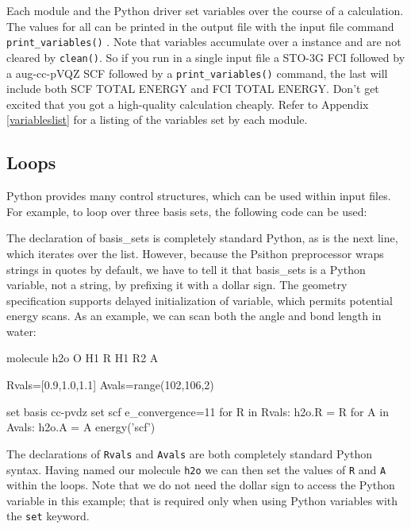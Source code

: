 Each module and the Python driver set \PSI variables over the course of
a calculation.  The values for all can be printed in the output file
with the input file command \texttt{print\_variables()} . Note that
\PSI variables accumulate over a \PSIfour instance and are not cleared by
\texttt{clean()}. So if you run in a single input file a STO-3G FCI
followed by a aug-cc-pVQZ SCF followed by a \texttt{print\_variables()}
command, the last will include both SCF TOTAL ENERGY and FCI TOTAL
ENERGY. Don't get excited that you got a high-quality calculation
cheaply. Refer to Appendix \ref{variableslist} for a listing of the
variables set by each module.

\subsection{Loops}
Python provides many control structures, which can be used within \PSIfour
input files. For example, to loop over three basis sets, the following code can
be used:
The declaration of basis\_sets is completely standard Python, as is the next
line, which iterates over the list. However, because the Psithon preprocessor
wraps strings in quotes by default, we have to tell it that basis\_sets is a
Python variable, not a string, by prefixing it with a dollar sign. The geometry
specification supports delayed initialization of variable, which permits
potential energy scans. As an example, we can scan both the angle and bond
length in water:
\begin{Snippet}
molecule h2o{
  O
  H1 R
  H1 R2 A
}

Rvals=[0.9,1.0,1.1]
Avals=range(102,106,2)

set basis cc-pvdz
set scf e_convergence=11
for R in Rvals:
    h2o.R = R
    for A in Avals:
        h2o.A = A
        energy('scf')
\end{Snippet}
The declarations of {\tt Rvals} and {\tt Avals} are both completely standard Python syntax.
Having named our molecule {\tt h2o} we can then set the values of {\tt R} and {\tt A} within
the loops. Note that we do not need the dollar sign to access the Python
variable in this example; that is required only when using Python variables
with the {\tt set} keyword.

